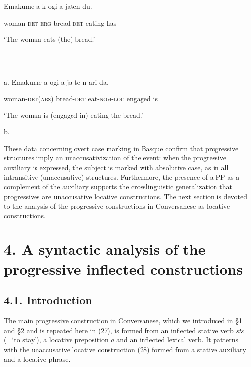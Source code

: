 \documentclass[output=paper]{langsci/langscibook}
\begin{document}
\ea%
    \label{ex:key:25}
    \gll\\
        \\
    \glt
    \z

          Emakume{}-a-k   ogi-a      jaten  du.

woman-\textsc{det}{}-\textsc{erg} bread-\textsc{det} eating  has

‘The woman eats (the) bread.’

\ea%
    \label{ex:key:26}
    \gll\\
        \\
    \glt
    \z

          a.  Emakume-a     ogi-a      ja-te-n   ari     da.

      woman-\textsc{det}(\textsc{abs)} bread-\textsc{det} eat-\textsc{nom}{}-\textsc{loc} engaged   is

     ‘The woman is (engaged in) eating the bread.’

b.

 

         \citep{Laka2006}

These data concerning overt case marking in Basque confirm that progressive structures imply an unaccusativization of the event: when the progressive auxiliary is expressed, the subject is marked with absolutive case, as in all intransitive (unaccusative) structures. Furthermore, the presence of a PP as a complement of the auxiliary supports the crosslinguistic generalization that progressives are unaccusative locative constructions. The next section is devoted to the analysis of the progressive constructions in Conversanese as locative constructions. 

\section{ 4. A syntactic analysis of the progressive inflected constructions}

\subsection{ 4.1. Introduction}

The main progressive construction in Conversanese, which we introduced in §1 and §2 and is repeated here in (27), is formed from an inflected stative verb \textit{stɛ} (=‘to stay’), a locative preposition \textit{a} and an inflected lexical verb. It patterns with the unaccusative locative construction (28) formed from a stative auxiliary and a locative phrase. 
\end{document}
